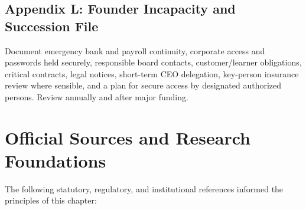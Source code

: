 \subsection{Appendix L: Founder Incapacity and Succession File}

Document emergency bank and payroll continuity, corporate access and passwords held securely, responsible board contacts, customer/learner obligations, critical contracts, legal notices, short-term CEO delegation, key-person insurance review where sensible, and a plan for secure access by designated authorized persons. Review annually and after major funding.

\section{Official Sources and Research Foundations}

The following statutory, regulatory, and institutional references informed the principles of this chapter:

